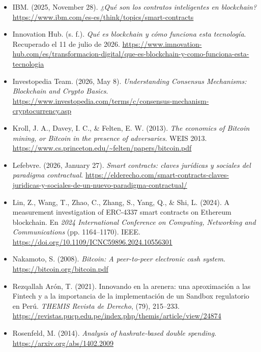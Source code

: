 \documentclass[12pt,a4paper]{article}
\begin{document}
\begin{itemize}
\item IBM. (2025, November 28). \textit{¿Qué son los contratos inteligentes en blockchain?}
\url{https://www.ibm.com/es-es/think/topics/smart-contracts}

\item Innovation Hub. (s. f.). \textit{Qué es blockchain y cómo funciona esta tecnología}. Recuperado el 11 de julio de 2026.
\url{https://www.imnovation-hub.com/es/transformacion-digital/que-es-blockchain-y-como-funciona-esta-tecnologia}

\item Investopedia Team. (2026, May 8). \textit{Understanding Consensus Mechanisms: Blockchain and Crypto Basics}.
\url{https://www.investopedia.com/terms/c/consensus-mechanism-cryptocurrency.asp}

\item Kroll, J. A., Davey, I. C., \& Felten, E. W. (2013). \textit{The economics of Bitcoin mining, or Bitcoin in the presence of adversaries}. WEIS 2013.
\url{https://www.cs.princeton.edu/~felten/papers/bitcoin.pdf}

\item Lefebvre. (2026, January 27). \textit{Smart contracts: claves jurídicas y sociales del paradigma contractual}.
\url{https://elderecho.com/smart-contracts-claves-juridicas-y-sociales-de-un-nuevo-paradigma-contractual/}

\item Lin, Z., Wang, T., Zhao, C., Zhang, S., Yang, Q., \& Shi, L. (2024). A measurement investigation of ERC-4337 smart contracts on Ethereum blockchain. En \textit{2024 International Conference on Computing, Networking and Communications} (pp. 1164--1170). IEEE.
\url{https://doi.org/10.1109/ICNC59896.2024.10556301}

\item Nakamoto, S. (2008). \textit{Bitcoin: A peer-to-peer electronic cash system}.
\url{https://bitcoin.org/bitcoin.pdf}

\item Rezqallah Arón, T. (2021). Innovando en la arenera: una aproximación a las Fintech y a la importancia de la implementación de un Sandbox regulatorio en Perú. \textit{THEMIS Revista de Derecho}, (79), 215--233.
\url{https://revistas.pucp.edu.pe/index.php/themis/article/view/24874}

\item Rosenfeld, M. (2014). \textit{Analysis of hashrate-based double spending}.
\url{https://arxiv.org/abs/1402.2009}


\end{itemize}
\end{document}
